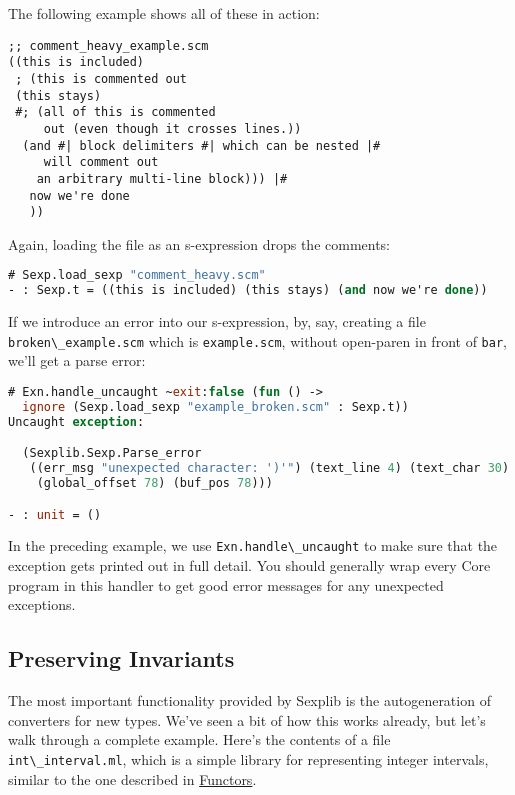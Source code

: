 The following example shows all of these in action:

\begin{lstlisting}
;; comment_heavy_example.scm
((this is included)
 ; (this is commented out
 (this stays)
 #; (all of this is commented
     out (even though it crosses lines.))
  (and #| block delimiters #| which can be nested |#
     will comment out
    an arbitrary multi-line block))) |#
   now we're done
   ))
\end{lstlisting}

Again, loading the file as an s-expression drops the comments:

\begin{lstlisting}[language=Caml]
# Sexp.load_sexp "comment_heavy.scm"
- : Sexp.t = ((this is included) (this stays) (and now we're done))
\end{lstlisting}

If we introduce an error into our s-expression, by, say, creating a file
\passthrough{\lstinline!broken\_example.scm!} which is
\passthrough{\lstinline!example.scm!}, without open-paren in front of
\passthrough{\lstinline!bar!}, we'll get a parse error:

\begin{lstlisting}[language=Caml]
# Exn.handle_uncaught ~exit:false (fun () ->
  ignore (Sexp.load_sexp "example_broken.scm" : Sexp.t))
Uncaught exception:

  (Sexplib.Sexp.Parse_error
   ((err_msg "unexpected character: ')'") (text_line 4) (text_char 30)
    (global_offset 78) (buf_pos 78)))

- : unit = ()
\end{lstlisting}

In the preceding example, we use
\passthrough{\lstinline!Exn.handle\_uncaught!} to make sure that the
exception gets printed out in full detail. You should generally wrap
every Core program in this handler to get good error messages for any
unexpected exceptions.

\hypertarget{preserving-invariants}{%
\subsection{Preserving Invariants}\label{preserving-invariants}}

The most important functionality provided by Sexplib is the
autogeneration of converters for new types. We've seen a bit of how this
works already, but let's walk through a complete example. Here's the
contents of a file \passthrough{\lstinline!int\_interval.ml!}, which is
a simple library for representing integer intervals, similar to the one
described in \href{functors.html\#functors}{Functors}.

